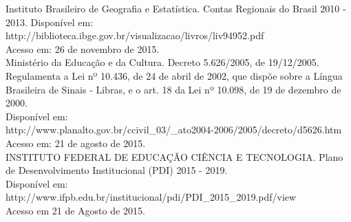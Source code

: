 Instituto Brasileiro de Geografia e Estatística. Contas Regionais do Brasil 2010 - 2013. 
Disponível em:\\http://biblioteca.ibge.gov.br/visualizacao/livros/liv94952.pdf\\Acesso em: 26 de novembro de 2015.\\

Ministério da Educação e da Cultura. Decreto 5.626/2005, de 19/12/2005. Regulamenta a Lei nº 10.436, de 24 de abril de 2002, que dispõe sobre a Língua Brasileira de Sinais - Libras, e o art. 18 da Lei nº 10.098, de 19 de dezembro de 2000.\\
Disponível em:\\ http://www.planalto.gov.br/ccivil\_03/\_ato2004-2006/2005/decreto/d5626.htm\\Acesso em: 21 de agosto de 2015.\\

INSTITUTO FEDERAL DE EDUCAÇÃO CIÊNCIA E TECNOLOGIA. Plano de Desenvolvimento Institucional (PDI) 2015 - 2019.\\
Disponível em:\\ http://www.ifpb.edu.br/institucional/pdi/PDI\_2015\_2019.pdf/view\\
Acesso em 21 de Agosto de 2015.\\
